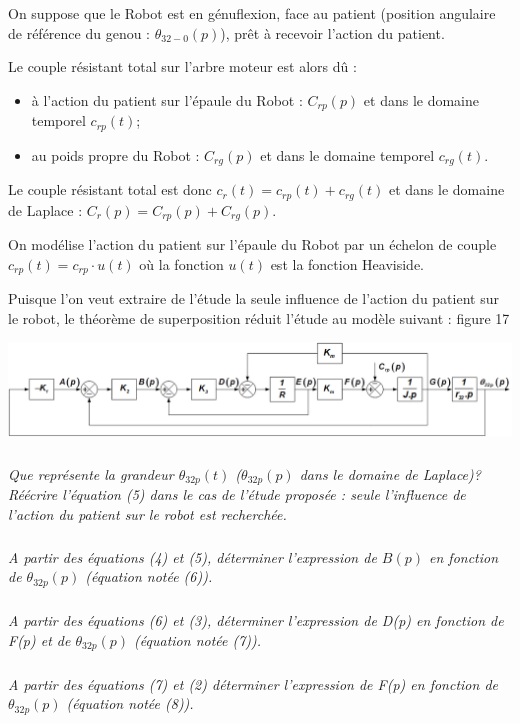 \documentclass[10pt]{article}
\begin{document}
On suppose que le Robot est en génuflexion, face au patient (position angulaire de référence du genou : $\theta_{32-0} (p)$), prêt à recevoir l'action du patient.

Le couple résistant total sur l'arbre moteur est alors dû : 
\begin{itemize}
\item à l'action du patient sur l'épaule du Robot : $C_{rp} (p)$ et dans le domaine temporel $c_{rp} (t)$;
\item au poids propre du Robot : $C_{rg} (p)$ et dans le domaine temporel $c_{rg} (t)$.
\end{itemize}

Le couple résistant total est donc $c_r (t)=c_{rp} (t)+c_{rg} (t)$ et dans le domaine de Laplace :
$C_r (p)=C_{rp} (p)+C_{rg} (p)$.


On modélise l'action du patient sur l'épaule du Robot par un échelon de couple  $c_{rp} (t)=c_{rp}\cdot u(t)$
 où la fonction $u(t)$ est la fonction Heaviside.

Puisque l'on veut extraire de l'étude la seule influence de l'action du patient sur le robot, le théorème de superposition réduit l'étude au modèle suivant : figure 17

\begin{center}
\includegraphics[width=\textwidth]{images/Fig03}
\end{center}

\subparagraph{}
\textit{Que représente la grandeur  $\theta_{32p} (t)$ ($\theta_{32p} (p)$  dans le domaine de Laplace)? Réécrire l'équation (5) dans le cas de l'étude proposée : seule l'influence de l'action du patient sur le robot est recherchée.}


\subparagraph{}
\textit{A partir des équations (4) et (5), déterminer l'expression de $B(p)$ en fonction de $\theta_{32p} (p)$ (équation notée (6)).}


\subparagraph{}
\textit{A partir des équations (6) et (3), déterminer l'expression de D(p) en fonction de F(p) et de $\theta_{32p} (p)$ (équation notée (7)).}


\subparagraph{}
\textit{A partir des équations (7) et (2) déterminer l'expression de F(p) en fonction de $\theta_{32p} (p)$ (équation notée (8)).}
\end{document}
